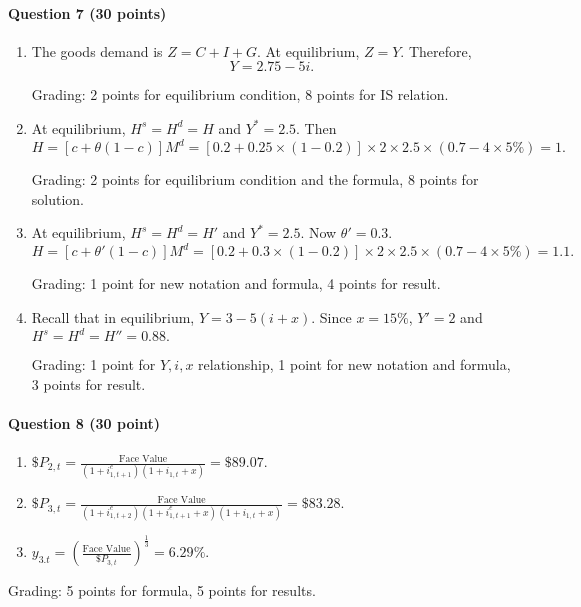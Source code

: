 \documentclass[12pt]{article}
\begin{document}
\paragraph{Question 7 (30 points)}
\begin{enumerate}[label=\alph*.]
	\item The goods demand is $Z=C+I+G$. At equilibrium, $Z=Y$. Therefore,
	\[Y = 2.75 - 5i.\]

	Grading: 2 points for equilibrium condition, 8 points for IS relation.

	\item At equilibrium, $H^s = H^d = H$ and $Y^* = 2.5$. Then
	\[H = [c + \theta(1-c)]M^d = [0.2 + 0.25\times(1-0.2)]\times 2\times 2.5 \times (0.7 - 4 \times 5\%) = 1.\]

	Grading: 2 points for equilibrium condition and the formula, 8 points for solution.

	\item At equilibrium, $H^s = H^d = H'$ and $Y^* = 2.5$. Now $\theta' = 0.3$. 
	\[H = [c + \theta'(1-c)]M^d = [0.2 + 0.3\times(1-0.2)]\times 2\times 2.5 \times (0.7 - 4 \times 5\%) = 1.1.\]

	Grading: 1 point for new notation and formula, 4 points for result.

	\item Recall that in equilibrium, $Y = 3 - 5(i+x)$. Since $x = 15\%$, $Y' = 2$ and $H^s = H^d = H'' = 0.88.$ 
	
	Grading: 1 point for $Y, i ,x$ relationship, 1 point for new notation and formula, 3 points for result.
\end{enumerate}

\paragraph{Question 8 (30 point)}
\begin{enumerate}[label=\alph*.]
	\item $\$P_{2,t} = \frac{\text{Face Value}}{(1+i_{1,t+1}^e)(1+i_{1,t}+x)} = \$89.07.$
	\item $\$P_{3,t} = \frac{\text{Face Value}}{(1+i_{1,t+2}^e)(1+i_{1,t+1}^e+x)(1+i_{1,t}+x)} = \$83.28.$
	\item $y_{3.t} = \left(\frac{\text{Face Value}}{\$P_{3,t}}\right)^{\frac{1}{3}}=6.29\%.$
\end{enumerate}
Grading: 5 points for formula, 5 points for results.
\end{document}
